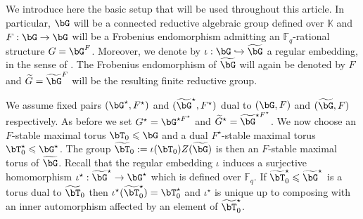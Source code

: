 \documentclass[eqthmnum, nocolour]{jt-calcs}
\begin{document}
\begin{pa}\label{pa:basic-setup}
We introduce here the basic setup that will be used throughout this article. In particular, $\bG$ will be a connected reductive algebraic group defined over $\mathbb{K}$ and $F : \bG \to \bG$ will be a Frobenius endomorphism admitting an $\mathbb{F}_q$-rational structure $G = \bG^F$. Moreover, we denote by $\iota : \bG \hookrightarrow \widetilde{\bG}$ a regular embedding, in the sense of \cite[\S7]{lusztig:1988:reductive-groups-with-a-disconnected-centre}. The Frobenius endomorphism of $\widetilde{\bG}$ will again be denoted by $F$ and $\widetilde{G} = \widetilde{\bG}^F$ will be the resulting finite reductive group. 

We assume fixed pairs $(\bG^{\star},F^{\star})$ and $(\widetilde{\bG}^{\star},F^{\star})$ dual to $(\bG,F)$ and $(\widetilde{\bG},F)$ respectively. As before we set $G^{\star} = \bG^{\star F^{\star}}$ and $\widetilde{G}^{\star} = \widetilde{\bG}^{\star F^{\star}}$. We now choose an $F$-stable maximal torus $\bT_0 \leqslant \bG$ and a dual $F^{\star}$-stable maximal torus $\bT_0^{\star} \leqslant \bG^{\star}$. The group $\widetilde{\bT}_0 := \iota(\bT_0)Z(\widetilde{\bG})$ is then an $F$-stable maximal torus of $\widetilde{\bG}$. Recall that the regular embedding $\iota$ induces a surjective homomorphism $\iota^{\star} : \widetilde{\bG}^{\star} \to \bG^{\star}$ which is defined over $\mathbb{F}_q$. If $\widetilde{\bT}_0^{\star} \leqslant \widetilde{\bG}^{\star}$ is a torus dual to $\widetilde{\bT}_0$ then $\iota^{\star}(\widetilde{\bT}_0^{\star}) = \bT_0^{\star}$ and $\iota^{\star}$ is unique up to composing with an inner automorphism affected by an element of $\widetilde{\bT}_0^{\star}$.
\end{pa}
\end{document}
